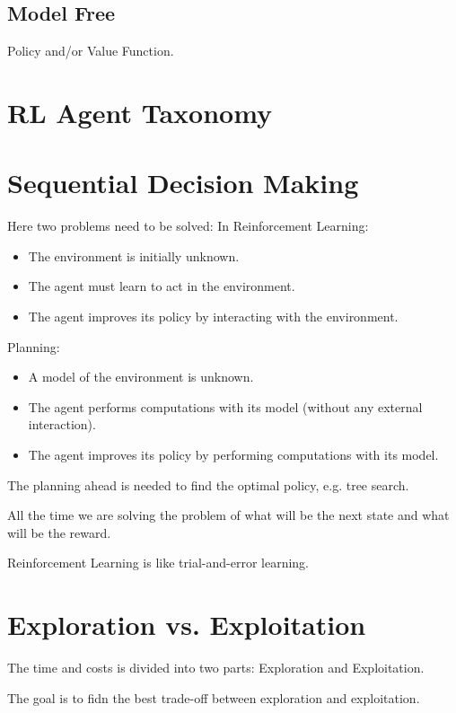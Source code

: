 \begin{itemize}
\subsection{Model Free}
Policy and/or Value Function.


\section{RL Agent Taxonomy}


\section{Sequential Decision Making}
Here two problems need to be solved:
In Reinforcement Learning:
\begin{itemize}
    \item The environment is initially unknown.
    \item The agent must learn to act in the environment.
    \item The agent improves its policy by interacting with the environment.
\end{itemize}

Planning:
\begin{itemize}
    \item A model of the environment is unknown.
    \item The agent performs computations with its model (without any external interaction).
    \item The agent improves its policy by performing computations with its model.
\end{itemize}

The planning ahead is needed to find the optimal policy, e.g. tree search.

All the time we are solving the problem of what will be the next state and what will be the reward.

Reinforcement Learning is like trial-and-error learning.


\section{Exploration vs. Exploitation}\label{sec:exploration-vs.-exploitation}
The time and costs is divided into two parts: Exploration and Exploitation.

The goal is to fidn the best trade-off between exploration and exploitation.


\end{itemize}
